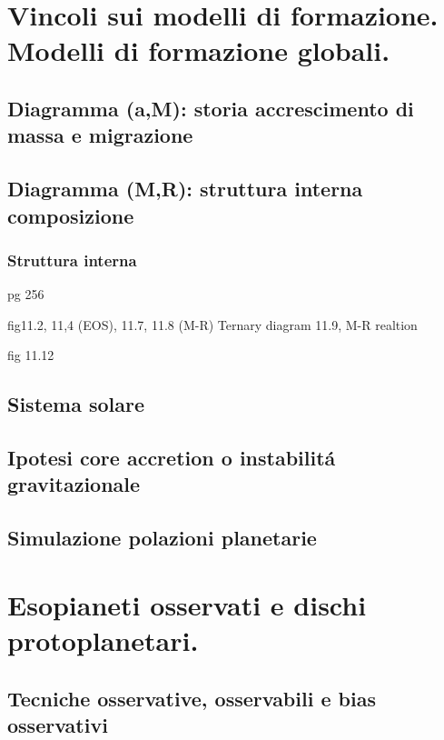 {\let\clearpage\relax\let\cleardoublepage\relax
\chapter{Vincoli sui modelli di formazione. Modelli di formazione globali.}
}

\section{Diagramma (a,M): storia accrescimento di massa e migrazione}

\section{Diagramma (M,R): struttura interna composizione}

\subsection{Struttura interna}

pg 256 
\begin{workout}[M-R diagram]
fig11.2, 11,4 (EOS), 11.7, 11.8 (M-R)
Ternary diagram 11.9, M-R realtion
\end{workout}

\begin{workout}
fig 11.12
\end{workout}

\section{Sistema solare}

\section{Ipotesi core accretion o instabilit\'a gravitazionale}

\section{Simulazione polazioni planetarie}


{\let\clearpage\relax\let\cleardoublepage\relax
\chapter{Esopianeti osservati e dischi protoplanetari.}
}

\section{Tecniche osservative, osservabili e bias osservativi}

